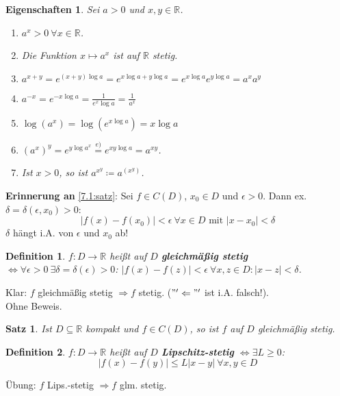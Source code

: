 \documentclass{extreport}
\newcommand{\R}{\mathbb{R}}
\theoremstyle{named}
\theoremstyle{dotless}
\newtheorem{satz}[namedtheorem]{Satz}
\newtheorem*{definition}{Definition}
\newtheorem*{eigenschaften}{Eigenschaften}
\begin{document}
\begin{eigenschaften}
	Sei $a > 0$ und $x, y \in \R$.
	\begin{enumerate}
		\item $a^{x} > 0 ~\forall x \in \R$.
		\item Die Funktion $x \mapsto a^{x}$ ist auf $\R$ stetig.
		\item $a^{x+y} = e^{(x+y)\log a} = e^{x\log a + y \log a} = e^{x \log a} e^{y \log a} = a^{x} a^{y}$
		\item $a^{-x} = e^{-x\log a} = \frac{1}{e^{x} \log a} = \frac{1}{a^{x}}$
		\item $\log(a^{x}) = \log ( e^{x \log a}) = x \log a$
		\item $(a^{x})^{y} = e^{y \log a^{x}} \overset{e)}{=} e^{xy \log a} = a^{xy}$.
		\item Ist $x > 0$, so ist $a^{x^{y}} \coloneqq a^{\left(x^{y}\right)}$.
	\end{enumerate}	
\end{eigenschaften}


\textbf{Erinnerung an} \ref{7.1:satz}: Sei $f \in C(D)$, $x_{0} \in D$ und $\epsilon > 0$. Dann ex. $\delta = \delta(\epsilon, x_{0}) > 0$:
	$$ |f(x) - f(x_{0})| < \epsilon ~\forall x \in D \text{ mit } |x - x_{0}| < \delta $$
	$\delta$ hängt i.A. von $\epsilon$ und $x_{0}$ ab!

\begin{definition}
	$f \colon D \rightarrow \R$ hei{\ss}t auf $D$ \textbf{gleichmä{\ss}ig stetig} $\iff \forall \epsilon > 0 ~\exists \delta = \delta(\epsilon) > 0$: $|f(x) - f(z)| < \epsilon ~\forall x, z \in D: |x - z| < \delta$.
\end{definition}

Klar: $f$ gleichmä{\ss}ig stetig $\Rightarrow f$ stetig. ($"'\Leftarrow "'$ ist i.A. falsch!). \\
Ohne Beweis.

\begin{satz} \label{7.16:satz}
	Ist $D \subseteq \R$ kompakt und $f \in C(D)$, so ist $f$ auf $D$ gleichmä{\ss}ig stetig.
\end{satz}


\begin{definition}
	$f \colon D \rightarrow \R$ hei{\ss}t auf $D$ \textbf{Lipschitz-stetig} $\iff \exists L \geq 0$:
	$$ | f(x) - f(y) | \leq L |x - y| ~\forall x, y \in D  $$
\end{definition}

Übung: $f$ Lips.-stetig $\Rightarrow f$ glm. stetig.
\end{document}
